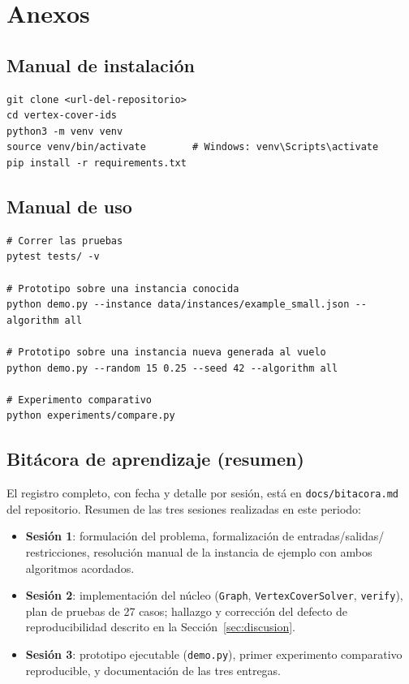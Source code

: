 \documentclass[11pt,a4paper]{article}
\begin{document}
\appendix
\section{Anexos}

\subsection{Manual de instalación}
\begin{lstlisting}
git clone <url-del-repositorio>
cd vertex-cover-ids
python3 -m venv venv
source venv/bin/activate        # Windows: venv\Scripts\activate
pip install -r requirements.txt
\end{lstlisting}

\subsection{Manual de uso}
\begin{lstlisting}
# Correr las pruebas
pytest tests/ -v

# Prototipo sobre una instancia conocida
python demo.py --instance data/instances/example_small.json --algorithm all

# Prototipo sobre una instancia nueva generada al vuelo
python demo.py --random 15 0.25 --seed 42 --algorithm all

# Experimento comparativo
python experiments/compare.py
\end{lstlisting}

\subsection{Bitácora de aprendizaje (resumen)}
\label{anexo:bitacora}
El registro completo, con fecha y detalle por sesión, está en
\texttt{docs/bitacora.md} del repositorio. Resumen de las tres sesiones realizadas en este
periodo:

\begin{itemize}
	\item \textbf{Sesión 1}: formulación del problema, formalización de entradas/salidas/
	restricciones, resolución manual de la instancia de ejemplo con ambos algoritmos
	acordados.
	\item \textbf{Sesión 2}: implementación del núcleo (\texttt{Graph}, \texttt{VertexCoverSolver},
	\texttt{verify}), plan de pruebas de 27 casos; hallazgo y corrección del defecto de
	reproducibilidad descrito en la Sección~\ref{sec:discusion}.
	\item \textbf{Sesión 3}: prototipo ejecutable (\texttt{demo.py}), primer experimento
	comparativo reproducible, y documentación de las tres entregas.
\end{itemize}
\end{document}
